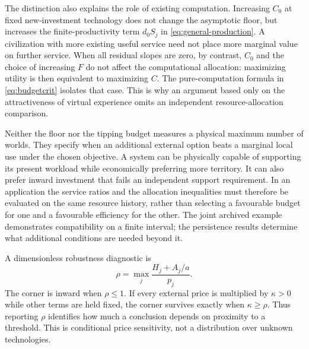 \documentclass[11pt,a4paper]{article}
\theoremstyle{definition}\newtheorem{definition}{Definition}
\begin{document}
The distinction also explains the role of existing computation. Increasing
$C_0$ at fixed new-investment technology does not change the asymptotic
floor, but increases the finite-productivity term $d_0S_j$ in
\cref{eq:general-production}. A civilization with more existing useful
service need not place more marginal value on further service. When all
residual slopes are zero, by contrast, $C_0$ and the choice of increasing
$F$ do not affect the computational allocation: maximizing utility is
then equivalent to maximizing $C$. The pure-computation formula in
\cref{eq:budgetcrit} isolates that case. This is why an argument based
only on the attractiveness of virtual experience omits an independent
resource-allocation comparison.

Neither the floor nor the tipping budget measures a physical maximum
number of worlds. They specify when an additional external option beats
a marginal local use under the chosen objective. A system can be physically
capable of supporting its present workload while economically preferring
more territory. It can also prefer inward investment that fails an
independent support requirement. In an application the service ratios and
the allocation inequalities must therefore be evaluated on the same
resource history, rather than selecting a favourable budget for one and a
favourable efficiency for the other. The joint archived example demonstrates
compatibility on a finite interval; the persistence results determine what
additional conditions are needed beyond it.

A dimensionless robustness diagnostic is
\begin{equation}
 \rho=\max_j\frac{H_j+A_j/a}{p_j}.
 \label{eq:rho}
\end{equation}
The corner is inward when $\rho\leq1$. If every external price is multiplied by $\kappa>0$ while other terms are held fixed, the corner survives exactly when $\kappa\geq\rho$. Thus reporting $\rho$ identifies how much a conclusion depends on proximity to a threshold. This is conditional price sensitivity, not a distribution over unknown technologies.
\end{document}
